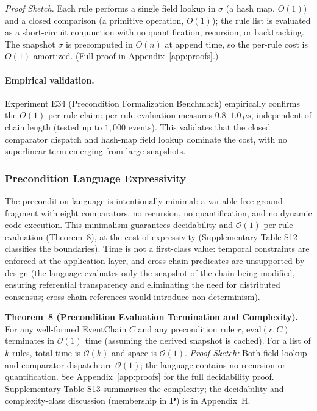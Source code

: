 \emph{Proof Sketch.} Each rule performs a single field lookup in $\sigma$ (a hash map, $O(1)$) and a closed comparison (a primitive operation, $O(1)$); the rule list is evaluated as a short-circuit conjunction with no quantification, recursion, or backtracking. The snapshot $\sigma$ is precomputed in $O(n)$ at append time, so the per-rule cost is $O(1)$ amortized. (Full proof in Appendix~\ref{app:proofs}.)

\paragraph{Empirical validation.} Experiment E34 (Precondition Formalization Benchmark) empirically confirms the $O(1)$ per-rule claim: per-rule evaluation measures $0.8$--$1.0\,\mu\text{s}$, independent of chain length (tested up to $1{,}000$ events). This validates that the closed comparator dispatch and hash-map field lookup dominate the cost, with no superlinear term emerging from large snapshots.

\subsubsection{Precondition Language Expressivity}

The precondition language is intentionally minimal: a variable-free ground fragment with eight comparators, no recursion, no quantification, and no dynamic code execution. This minimalism guarantees decidability and $\mathcal{O}(1)$ per-rule evaluation (Theorem~8), at the cost of expressivity (Supplementary Table S12 classifies the boundaries). Time is not a first-class value: temporal constraints are enforced at the application layer, and cross-chain predicates are unsupported by design (the language evaluates only the snapshot of the chain being modified, ensuring referential transparency and eliminating the need for distributed consensus; cross-chain references would introduce non-determinism).

\textbf{Theorem~8 (Precondition Evaluation Termination and Complexity).} For any well-formed EventChain $C$ and any precondition rule $r$, $\text{eval}(r, C)$ terminates in $\mathcal{O}(1)$ time (assuming the derived snapshot is cached). For a list of $k$ rules, total time is $\mathcal{O}(k)$ and space is $\mathcal{O}(1)$. \emph{Proof Sketch:} Both field lookup and comparator dispatch are $\mathcal{O}(1)$; the language contains no recursion or quantification. See Appendix~\ref{app:proofs} for the full decidability proof. Supplementary Table S13 summarises the complexity; the decidability and complexity-class discussion (membership in \textbf{P}) is in Appendix~H.

